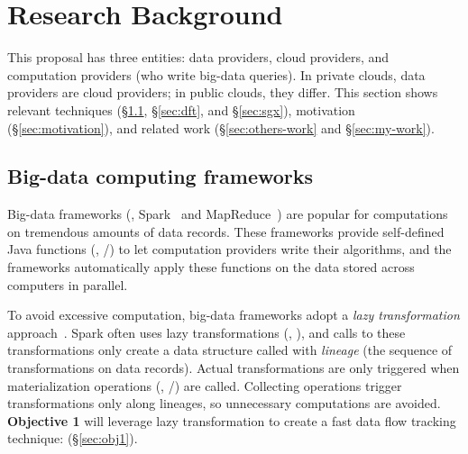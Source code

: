 \vspace{-.15in}\section{Research Background} 
\label{sec:background}\vspace{-.075in}

This proposal has three entities: data providers, cloud 
providers, and computation providers (who write big-data queries). In 
private clouds, data providers are cloud providers; in public clouds, 
they differ. This section shows relevant techniques (\S\ref{sec:bigdata}, 
\S\ref{sec:dft}, and \S\ref{sec:sgx}), motivation (\S\ref{sec:motivation}), and 
related work (\S\ref{sec:others-work} and \S\ref{sec:my-work}).


\vspace{-.15in}\subsection{Big-data computing frameworks} 
\label{sec:bigdata}\vspace{-.075in}

Big-data frameworks (\eg, Spark~\cite{nsdi12:spark} and 
MapReduce~\cite{mapreduce}) are popular for computations on tremendous amounts 
of data records. These frameworks provide self-defined Java functions (\eg, 
/) to let computation providers write their algorithms, 
and the frameworks automatically apply these functions on the data stored 
across computers in parallel.



To avoid excessive computation, big-data frameworks adopt a \emph{lazy 
transformation} approach~\cite{pig:vldb08,nsdi12:spark,osdi08:dryad}. Spark 
often uses lazy transformations (\eg, ), and calls to 
these transformations only create a data structure called  with 
\emph{lineage} (the sequence of transformations on data records).
Actual transformations are only triggered when materialization 
operations (\eg, /) are called. Collecting 
operations trigger transformations only along lineages, so unnecessary 
computations are avoided. \textbf{Objective 1} will leverage lazy 
transformation to create a fast data flow tracking technique: \lazyp 
(\S\ref{sec:obj1}).


